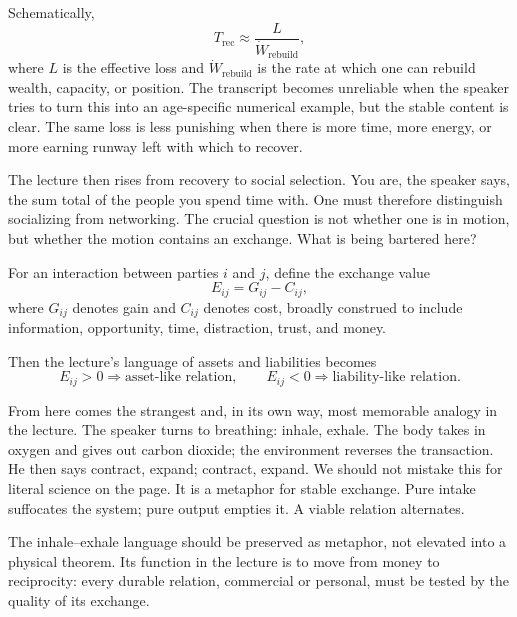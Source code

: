 Schematically,
\begin{equation}
T_{\text{rec}} \approx \frac{L}{\dot W_{\text{rebuild}}},
\end{equation}
where \(L\) is the effective loss and \(\dot W_{\text{rebuild}}\) is the rate at which one can rebuild wealth, capacity, or position. The transcript becomes unreliable when the speaker tries to turn this into an age-specific numerical example, but the stable content is clear. The same loss is less punishing when there is more time, more energy, or more earning runway left with which to recover.

The lecture then rises from recovery to social selection. You are, the speaker says, the sum total of the people you spend time with. One must therefore distinguish socializing from networking. The crucial question is not whether one is in motion, but whether the motion contains an exchange. What is being bartered here?

\begin{definition}
For an interaction between parties \(i\) and \(j\), define the exchange value
\begin{equation}
E_{ij}=G_{ij}-C_{ij},
\end{equation}
where \(G_{ij}\) denotes gain and \(C_{ij}\) denotes cost, broadly construed to include information, opportunity, time, distraction, trust, and money.
\end{definition}

Then the lecture's language of assets and liabilities becomes
\begin{equation}
E_{ij}>0 \Rightarrow \text{asset-like relation}, \qquad
E_{ij}<0 \Rightarrow \text{liability-like relation}.
\end{equation}

From here comes the strangest and, in its own way, most memorable analogy in the lecture. The speaker turns to breathing: inhale, exhale. The body takes in oxygen and gives out carbon dioxide; the environment reverses the transaction. He then says contract, expand; contract, expand. We should not mistake this for literal science on the page. It is a metaphor for stable exchange. Pure intake suffocates the system; pure output empties it. A viable relation alternates.

\begin{remark}
The inhale--exhale language should be preserved as metaphor, not elevated into a physical theorem. Its function in the lecture is to move from money to reciprocity: every durable relation, commercial or personal, must be tested by the quality of its exchange.
\end{remark}


